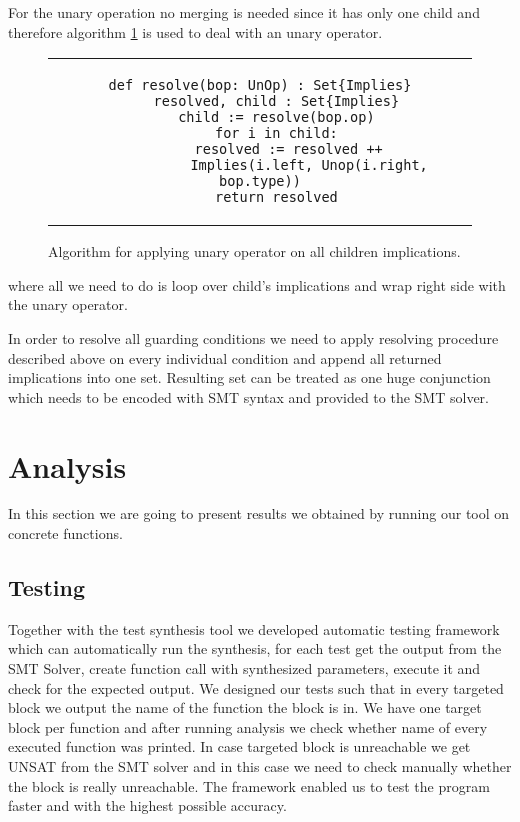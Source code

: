 \documentclass[letterpaper,12pt]{article}
\begin{document}
For the unary operation no merging is needed since it has only one child and therefore algorithm \ref{lst:ResolveUn} is used to deal with an unary operator.

\begin{figure}[thp] %
\centering 
\caption{Algorithm for applying unary operator on all children implications. }
\label{lst:ResolveUn}
\begin{tabular}{c}
\begin{lstlisting}
def resolve(bop: UnOp) : Set{Implies}
    resolved, child : Set{Implies}
    child := resolve(bop.op)
    for i in child:
        resolved := resolved ++ 
            Implies(i.left, Unop(i.right, bop.type))
    return resolved
\end{lstlisting}
\end{tabular}
\end{figure}

where all we need to do is loop over child's implications and wrap right side with the unary operator.

In order to resolve all guarding conditions we need to apply resolving procedure described above on every individual condition and append all returned implications into one set. Resulting set can be treated as one huge conjunction which needs to be encoded with SMT syntax and provided to the SMT solver.

\section{Analysis}
In this section we are going to present results we obtained by running our tool on concrete functions. 

\subsection{Testing}
Together with the test synthesis tool we developed automatic testing framework which can automatically run the synthesis, for each test get the output from the SMT Solver, create function call with synthesized parameters, execute it and check for the expected output. We designed our tests such that in every targeted block we output the name of the function the block is in. We have one target block per function and after running analysis we check whether name of every executed function was printed. In case targeted block is unreachable we get UNSAT from the SMT solver and in this case we need to check manually whether the block is really unreachable. The framework enabled us to test the program faster and with the highest possible accuracy. 
\end{document}
